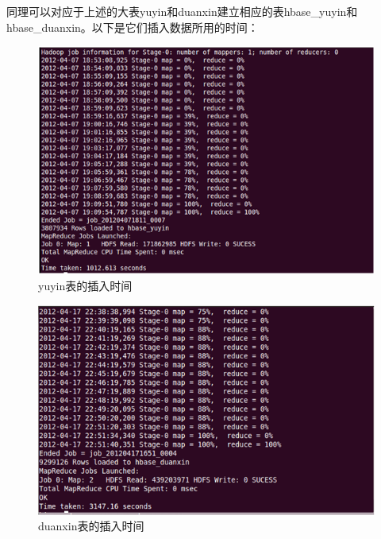 同理可以对应于上述的大表yuyin和duanxin建立相应的表hbase\_yuyin和hbase\_duanxin。以下是它们插入数据所用的时间：
\clearpage

\begin{figure}[!ht]
\centering
\includegraphics[scale=0.8]{photo/insert-yuyin-hbase.png} 
\caption{yuyin表的插入时间}
\end{figure} 

\begin{figure}[!ht]
\centering
\includegraphics[scale=0.8]{photo/insert-duanxin-hbase.png}
\caption{duanxin表的插入时间}
\end{figure} 

